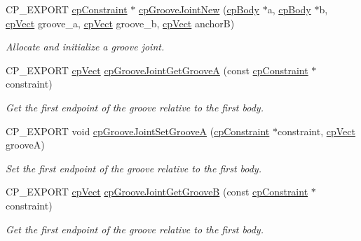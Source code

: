 \begin{DoxyCompactItemize}
\mbox{\label{group__cpGrooveJoint_ga4e27e2b8f533d387b68432d2ea5d4d95}} 
C\+P\+\_\+\+E\+X\+P\+O\+RT \hyperlink{structcpConstraint}{cp\+Constraint} $\ast$ \hyperlink{group__cpGrooveJoint_ga4e27e2b8f533d387b68432d2ea5d4d95}{cp\+Groove\+Joint\+New} (\hyperlink{structcpBody}{cp\+Body} $\ast$a, \hyperlink{structcpBody}{cp\+Body} $\ast$b, \hyperlink{structcpVect}{cp\+Vect} groove\+\_\+a, \hyperlink{structcpVect}{cp\+Vect} groove\+\_\+b, \hyperlink{structcpVect}{cp\+Vect} anchorB)
\begin{DoxyCompactList}\small\item\em Allocate and initialize a groove joint. \end{DoxyCompactList}\item 
\mbox{\label{group__cpGrooveJoint_gac1d547a55341236f9659ed31a278b903}} 
C\+P\+\_\+\+E\+X\+P\+O\+RT \hyperlink{structcpVect}{cp\+Vect} \hyperlink{group__cpGrooveJoint_gac1d547a55341236f9659ed31a278b903}{cp\+Groove\+Joint\+Get\+GrooveA} (const \hyperlink{structcpConstraint}{cp\+Constraint} $\ast$constraint)
\begin{DoxyCompactList}\small\item\em Get the first endpoint of the groove relative to the first body. \end{DoxyCompactList}\item 
\mbox{\label{group__cpGrooveJoint_gab3d7c3d52caae08d19bd6eadbcad4e2f}} 
C\+P\+\_\+\+E\+X\+P\+O\+RT void \hyperlink{group__cpGrooveJoint_gab3d7c3d52caae08d19bd6eadbcad4e2f}{cp\+Groove\+Joint\+Set\+GrooveA} (\hyperlink{structcpConstraint}{cp\+Constraint} $\ast$constraint, \hyperlink{structcpVect}{cp\+Vect} grooveA)
\begin{DoxyCompactList}\small\item\em Set the first endpoint of the groove relative to the first body. \end{DoxyCompactList}\item 
\mbox{\label{group__cpGrooveJoint_gafe3c54f440f638dde48bcc3be3e44cc5}} 
C\+P\+\_\+\+E\+X\+P\+O\+RT \hyperlink{structcpVect}{cp\+Vect} \hyperlink{group__cpGrooveJoint_gafe3c54f440f638dde48bcc3be3e44cc5}{cp\+Groove\+Joint\+Get\+GrooveB} (const \hyperlink{structcpConstraint}{cp\+Constraint} $\ast$constraint)
\begin{DoxyCompactList}\small\item\em Get the first endpoint of the groove relative to the first body. \end{DoxyCompactList}\item 

\end{DoxyCompactItemize}
